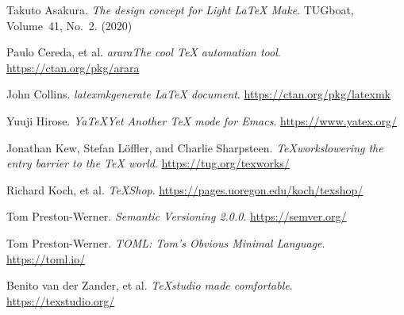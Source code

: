 \documentclass{llmk-doc}
\begin{document}
\begin{thebibliography}{9}
  Takuto Asakura. \textit{The design concept for \Dash Light {\LaTeX}
  Make}. TUGboat, Volume~41, No.~2. (2020)

  Paulo Cereda, et al. \textit{arara\Dash The cool {\TeX} automation
  tool}. \url{https://ctan.org/pkg/arara}

  John Collins. \textit{latexmk\Dash generate {\LaTeX} document}.
  \url{https://ctan.org/pkg/latexmk}

  Yuuji Hirose. \textit{YaTeX\Dash Yet Another TeX mode for Emacs}.
  \url{https://www.yatex.org/}

  Jonathan Kew, Stefan L\"offler, and Charlie Sharpsteen.
  \textit{{\TeX}works\Dash lowering the entry barrier to the {\TeX} world}.
  \url{https://tug.org/texworks/}

  Richard Koch, et al. \textit{{\TeX}Shop}.
  \url{https://pages.uoregon.edu/koch/texshop/}

  Tom Preston-Werner. \textit{Semantic Versioning 2.0.0}.
  \url{https://semver.org/}

  Tom Preston-Werner. \textit{TOML: Tom's Obvious Minimal Language}.
  \url{https://toml.io/}

  Benito van der Zander, et al.
  \textit{{\TeX}studio\Dash {\LaTeX} made comfortable}.\\
  \url{https://texstudio.org/}
\end{thebibliography}
\end{document}
